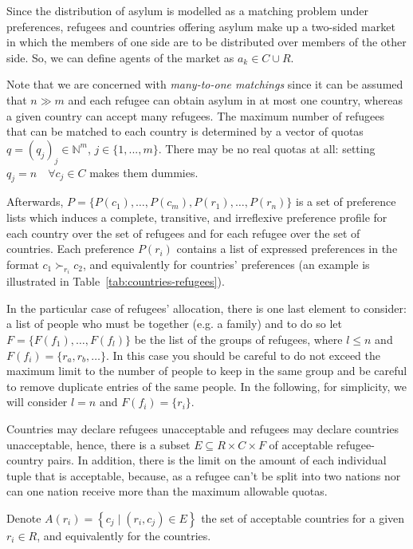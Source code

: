 \documentclass[letterpaper]{article} %
\begin{document}
    Since the distribution of asylum is modelled as a matching problem under preferences, refugees and countries offering asylum make up a two-sided market in which the members of one side are to be distributed over members of the other side.
    So, we can define agents of the market as $a_k \in C \cup R$.
    
    Note that we are concerned with \textit{many-to-one matchings} since it can be assumed that $n \gg m$ and each refugee can obtain asylum in at most one country, whereas a given country can accept many refugees. The maximum number of refugees that can be matched to each country is determined by a vector of quotas $q = (q_j)_j \in \mathbb{N}^m$, $j\in\{1,...,m\}$. There may be no real quotas at all: setting $q_j = n \quad \forall c_j \in C$ makes them dummies.

    Afterwards, $P = \{P(c_1), \dots, P(c_m), P(r_1), \dots, P(r_n)\}$ is a set of preference lists which induces a complete, transitive, and irreflexive preference profile for each country over the set of refugees and for each refugee over the set of countries.
    Each preference $P(r_i)$ contains a list of expressed preferences in the format $c_1 \succ_{r_i} c_2$, and equivalently for countries' preferences (an example is illustrated in Table~\ref{tab:countries-refugees}).

    In the particular case of refugees' allocation, there is one last element to consider: a list of people who must be together (e.g. a family) and to do so let $F=\{F(f_1), \dots, F(f_l)\}$ be the list of the groups of refugees, where $l \leq n$ and $F(f_i) = \{r_a, r_b, \dots\}$.
    In this case you should be careful to do not exceed the maximum limit to the number of people to keep in the same group and be careful to remove duplicate entries of the same people.
    In the following, for simplicity, we will consider $l=n$ and $F(f_i)=\{r_i\}$.

    Countries may declare refugees unacceptable and refugees may declare countries unacceptable, hence, there is a subset $E \subseteq R \times C \times F$ of acceptable refugee-country pairs.
    In addition, there is the limit on the amount of each individual tuple that is acceptable, because, as a refugee can't be split into two nations nor can one nation receive more than the maximum allowable quotas.
    
    Denote $A \left( r_i \right) = \left\{ c_j \mid \left( r_i, c_j \right) \in E \right\}$ the set of acceptable countries for a given $r_i \in R$, and equivalently for the countries.
    
\end{document}
